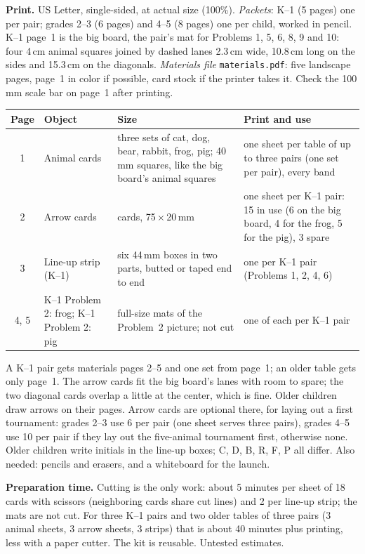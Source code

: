 \documentclass[11pt]{article}
\begin{document}
\textbf{Print.} US Letter, single-sided, at actual size (100\%). \emph{Packets}: K--1 (5 pages) one per pair; grades 2--3 (6 pages) and 4--5 (8 pages) one per child, worked in pencil. K--1 page~1 is the big board, the pair's mat for Problems 1, 5, 6, 8, 9 and 10: four 4\,cm animal squares joined by dashed lanes 2.3\,cm wide, 10.8\,cm long on the sides and 15.3\,cm on the diagonals. \emph{Materials file} \texttt{materials.pdf}: five landscape pages, page~1 in color if possible, card stock if the printer takes it. Check the 100\,mm scale bar on page~1 after printing.\par
{\renewcommand{\arraystretch}{1.12}\small\begin{tabular}{@{}c>{\raggedright\arraybackslash}p{3.3cm}>{\raggedright\arraybackslash}p{5.0cm}>{\raggedright\arraybackslash}p{7.4cm}@{}}
\toprule
Page & Object & Size & Print and use\\\midrule
1 & Animal cards & three sets of cat, dog, bear, rabbit, frog, pig; 40\,mm squares, like the big board's animal squares & one sheet per table of up to three pairs (one set per pair), every band\\
2 & Arrow cards & 18 cards, 75\,$\times$\,20\,mm & one sheet per K--1 pair: 15 in use (6 on the big board, 4 for the frog, 5 for the pig), 3 spare\\
3 & Line-up strip (K--1) & six 44\,mm boxes in two parts, butted or taped end to end & one per K--1 pair (Problems 1, 2, 4, 6)\\
4, 5 & K--1 Problem 2: frog; K--1 Problem 2: pig & full-size mats of the Problem~2 picture; not cut & one of each per K--1 pair\\\bottomrule
\end{tabular}}\par
A K--1 pair gets materials pages 2--5 and one set from page~1; an older table gets only page~1. The arrow cards fit the big board's lanes with room to spare; the two diagonal cards overlap a little at the center, which is fine. Older children draw arrows on their pages. Arrow cards are optional there, for laying out a first tournament: grades 2--3 use 6 per pair (one sheet serves three pairs), grades 4--5 use 10 per pair if they lay out the five-animal tournament first, otherwise none. Older children write initials in the line-up boxes; C, D, B, R, F, P all differ. Also needed: pencils and erasers, and a whiteboard for the launch.

\textbf{Preparation time.} Cutting is the only work: about 5 minutes per sheet of 18 cards with scissors (neighboring cards share cut lines) and 2 per line-up strip; the mats are not cut. For three K--1 pairs and two older tables of three pairs (3 animal sheets, 3 arrow sheets, 3 strips) that is about 40 minutes plus printing, less with a paper cutter. The kit is reusable. Untested estimates.
\end{document}
